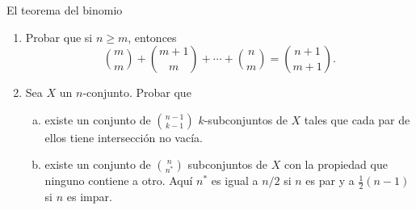 \begin{section}{El teorema del binomio}
\begin{enumerate}[1)]
\item Probar que si $n \ge m$, entonces
$$
\binom{m}{m}+\binom{m+1}{m}+\cdots+\binom{n}{m}=\binom{n+1}{m+1}.
$$

\item  Sea $X$ un $n$-conjunto. Probar que

\begin{enumerate}[a)]
	\item existe un conjunto de $\binom{n-1}{k-1}$ $k$-subconjuntos de
$X$ tales que cada par de ellos tiene intersección no vacía.

	\item existe un conjunto de $\binom{n}{n^*}$ subconjuntos de $X$ 
con la propiedad que ninguno contiene a otro. Aquí $n^*$ es igual
a $n/2$ si $n$ es par y a $\frac12(n-1)$ si $n$ es impar.
\end{enumerate}
\end{enumerate}

\end{section}

